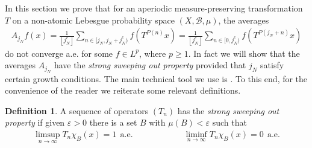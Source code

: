 \documentclass[12pt,leqno]{amsart}
\newcounter{counter}
\newcounter{counter2}
\numberwithin{equation}{section}
\numberwithin{counter2}{section}
\newcounter{theorem}
\theoremstyle{definition}
\newtheorem{definition}[subsection]{Definition}
\theoremstyle{plain}
\newcommand{\ep}{\varepsilon}
\newcommand{\floor}[1]{\left\lfloor #1 \right\rfloor}
\begin{document}
	
	
	In this section we prove that for an aperiodic measure-preserving transformation $T$ on a non-atomic Lebesgue probability space $(X, \mathcal{B}, \mu)$, the averages 
	\begin{align*}
		A_{j_N}^{} f(x) = \frac{1}{\floor{j_N^c}} \sum_{n\in [j_N, j_N + j_N^c)} f(T^{P(n)}x) = \frac{1}{\floor{j_N^c}} \sum_{ n \in  [0,  j_N^c)} f(T^{P(j_N + n)}x)
	\end{align*}
	do not converge a.e. for some $f \in L^p$, where $p \geq 1$. In fact we will show that the averages $A_{j_N}$ have the \textit{strong sweeping out property} provided that $j_N$ satisfy certain growth conditions. The main technical tool we use is \cite[Theorem 1.14]{SSOP_96}. To this end,  for the convenience of the reader we reiterate some relevant definitions.
	
	\begin{definition}
		A sequence of operators $(T_n)$ has the \textit{strong sweeping out property} if given $\ep>0$ there is a set $B$ with $\mu(B) < \ep$ such that
		\begin{align*}
			\limsup_{n \rightarrow \infty} T_n \chi_B (x) =1 \ \ \textrm{a.e.}  \hspace{1in} \liminf_{n \rightarrow \infty} T_n \chi_B (x) =0 \ \ \textrm{a.e.} 
		\end{align*}
	\end{definition}
	
	
	
	
	
\end{document}
